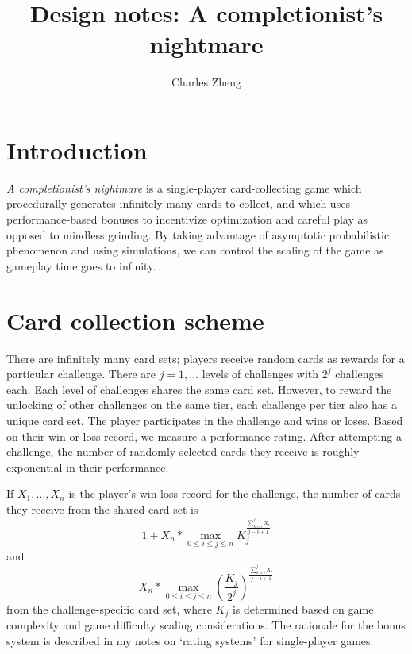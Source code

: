 \documentclass[11pt]{article}
\begin{document}
\newcommand{\tr}{\text{tr}}
\newcommand{\E}{\textbf{E}}
\newcommand{\diag}{\text{diag}}
\newcommand{\argmax}{\text{argmax}}
\newcommand{\Cov}{\text{Cov}}

\title{Design notes: A completionist's nightmare}
\author{Charles Zheng}
\maketitle

\section{Introduction}

\emph{A completionist's nightmare} is a single-player card-collecting game which
procedurally generates infinitely many cards to collect, and which uses
performance-based bonuses to incentivize optimization and careful play as opposed to mindless
grinding.
By taking advantage of asymptotic probabilistic phenomenon
and using simulations, we can control the scaling of the game as gameplay time goes to infinity.

\section{Card collection scheme}

There are infinitely many card sets; players receive random cards
as rewards for a particular challenge.
There are $j=1,\hdots$ levels of challenges with $2^j$ challenges each.
Each level of challenges shares the same card set.
However, to reward the unlocking of other challenges on the same tier,
each challenge per tier also has a unique card set.
The player participates in the challenge and wins or loses.
Based on their win or loss record, we measure a performance rating.
After attempting a challenge, the number of randomly selected cards they receive is roughly exponential in their performance.

If $X_1,\hdots,X_n$ is the player's win-loss record for the challenge, the number of cards they receive from the shared card set is
\[
1+X_n * \max_{0 \leq i \leq j \leq n} K_j^{\frac{\sum_{k=i}^j X_i}{j-i+1}}
\]
and
\[
X_n * \max_{0 \leq i \leq j \leq n} \left(\frac{K_j}{2^j}\right)^{\frac{\sum_{k=i}^j X_i}{j-i+1}}
\]
from the challenge-specific card set, where $K_j$ is determined based on game complexity and game difficulty scaling considerations.
The rationale for the bonus system is described in my notes on `rating systems' for single-player games.
\end{document}
